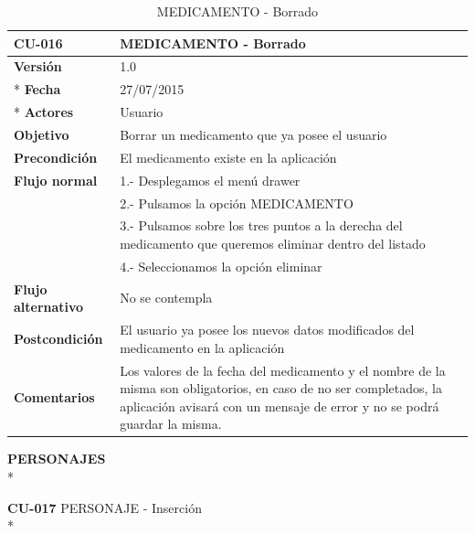 \documentclass[../pfc.tex]{subfiles}
\begin{document}
		\begin{table}[H]
			\centering
			\begin{tabular}[t]{|p{3cm}|p{9.5cm}|}
				\hline \textbf{CU-016} & \textbf{MEDICAMENTO - Borrado} \\*
				\hline\hline \textbf{Versión} & 1.0 \\ *
				\hline\hline \textbf{Fecha} & 27/07/2015 \\ *
				\hline\textbf{Actores} 	& Usuario\\*
				\hline \textbf{Objetivo} & Borrar un medicamento que ya posee el usuario\\* 			
				\hline \textbf{Precondición} & El medicamento existe en la aplicación\\* 
				\hline \textbf{Flujo normal} & 1.- Desplegamos el menú drawer \\* 
				& 2.- Pulsamos la opción MEDICAMENTO\\*	
				& 3.- Pulsamos sobre los tres puntos a la derecha del medicamento que queremos eliminar dentro del listado\\*	
				& 4.- Seleccionamos la opción eliminar\\*	
				\hline \textbf{Flujo alternativo} & No se contempla \\* 
				\hline \textbf{Postcondición} & El usuario ya posee los nuevos datos modificados del medicamento en la aplicación \\* 
				\hline \textbf{Comentarios}   & Los valores de la fecha del medicamento y el nombre de la misma son obligatorios, en caso de no ser completados, la aplicación avisará con un mensaje de error y no se podrá guardar la misma.\\*
				\hline
			\end{tabular}
			\caption{MEDICAMENTO - Borrado}
			\label{tabla:caso016}
		\end{table}
		
		
		
		\textbf{PERSONAJES}\\*
		
		\textbf{CU-017}	PERSONAJE - Inserción\\*
		
\end{document}
